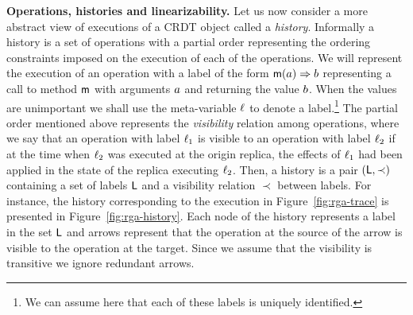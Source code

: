 \smallskip
\noindent
{\bf Operations, histories and linearizability.}
Let us now consider a more abstract view of executions of a 
CRDT object called a \emph{history}.
%
Informally a history is a set of operations with a partial order
representing the ordering constraints imposed on the execution of each
of the operations.
%
We will represent the execution of an operation with a label of the
form $\mathsf{m}(a) \Rightarrow b$ representing a call to method
$\mathsf{m}$ with arguments $a$ and returning the value $b$.
%
When the values are unimportant we shall use the meta-variable
$\ell$ to denote a label.\footnote{We can assume here that each of these labels is uniquely identified.}
%
The partial order mentioned above represents the \emph{visibility} relation among operations, where we say that an
operation with label $\ell_1$ is visible to an operation with
label $\ell_2$ if at the time when $\ell_2$ was executed
at the origin replica, the effects of $\ell_1$ had been applied
in the state of the replica executing $\ell_2$.
%
Then, a history is a pair $(\mathsf{L}, \prec)$ containing a
set of labels $\mathsf{L}$ and a visibility relation $\prec$ between labels. 
%
For instance, the history %
corresponding to the execution in Figure~\ref{fig:rga-trace} 
is presented in Figure~\ref{fig:rga-history}.
%
Each node of the history represents a label in the set $\mathsf{L}$
and arrows represent that the operation at the source of the arrow
is visible to the operation at the target.
%
Since we assume that the visibility is transitive we ignore
redundant arrows.

